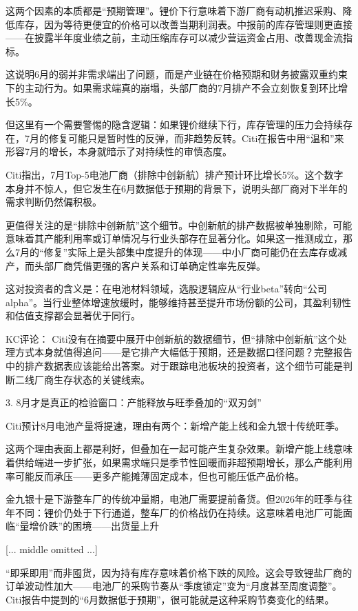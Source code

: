 \documentclass[11pt]{ctexart}
\begin{document}
这两个因素的本质都是“预期管理”。锂价下行意味着下游厂商有动机推迟采购、降低库存，因为等待更便宜的价格可以改善当期利润表。中报前的库存管理则更直接——在披露半年度业绩之前，主动压缩库存可以减少营运资金占用、改善现金流指标。

这说明6月的弱并非需求端出了问题，而是产业链在价格预期和财务披露双重约束下的主动行为。如果需求端真的崩塌，头部厂商的7月排产不会立刻恢复到环比增长5\%。

但这里有一个需要警惕的隐含逻辑：如果锂价继续下行，库存管理的压力会持续存在，7月的修复可能只是暂时性的反弹，而非趋势反转。Citi在报告中用“温和”来形容7月的增长，本身就暗示了对持续性的审慎态度。

Citi指出，7月Top-5电池厂商（排除中创新航）排产预计环比增长5\%。这个数字本身并不惊人，但它发生在6月数据低于预期的背景下，说明头部厂商对下半年的需求判断仍然偏积极。

更值得关注的是“排除中创新航”这个细节。中创新航的排产数据被单独剔除，可能意味着其产能利用率或订单情况与行业头部存在显著分化。如果这一推测成立，那么7月的“修复”实际上是头部集中度提升的体现——中小厂商可能仍在去库存或减产，而头部厂商凭借更强的客户关系和订单确定性率先反弹。

这对投资者的含义是：在电池材料领域，选股逻辑应从“行业beta”转向“公司alpha”。当行业整体增速放缓时，能够维持甚至提升市场份额的公司，其盈利韧性和估值支撑都会显著优于同行。

KC评论： Citi没有在摘要中展开中创新航的数据细节，但“排除中创新航”这个处理方式本身就值得追问——是它排产大幅低于预期，还是数据口径问题？完整报告中的排产数据表应该能给出答案。对于跟踪电池板块的投资者，这个细节可能是判断二线厂商生存状态的关键线索。

3. 8月才是真正的检验窗口：产能释放与旺季叠加的“双刃剑”

Citi预计8月电池产量将提速，理由有两个：新增产能上线和金九银十传统旺季。

这两个理由表面上都是利好，但叠加在一起可能产生复杂效果。新增产能上线意味着供给端进一步扩张，如果需求端只是季节性回暖而非超预期增长，那么产能利用率可能反而承压——更多产能摊薄固定成本，但也可能压低产品价格。

金九银十是下游整车厂的传统冲量期，电池厂需要提前备货。但2026年的旺季与往年不同：锂价仍处于下行通道，整车厂的价格战仍在持续。这意味着电池厂可能面临“量增价跌”的困境——出货量上升

[... middle omitted ...]

“即采即用”而非囤货，因为持有库存意味着价格下跌的风险。这会导致锂盐厂商的订单波动性加大——电池厂的采购节奏从“季度锁定”变为“月度甚至周度调整”。Citi报告中提到的“6月数据低于预期”，很可能就是这种采购节奏变化的结果。
\end{document}

